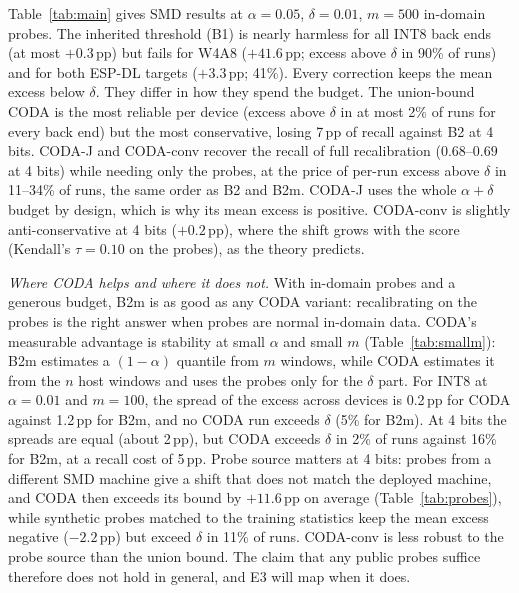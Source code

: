 \documentclass[conference]{IEEEtran}
\begin{document}


Table~\ref{tab:main} gives SMD results at $\alpha=0.05$, $\delta=0.01$, $m=500$ in-domain probes. The inherited threshold (B1) is nearly harmless for all INT8 back ends (at most $+0.3$\,pp) but fails for W4A8 ($+41.6$\,pp; excess above $\delta$ in 90\% of runs) and for both ESP-DL targets ($+3.3$\,pp; 41\%). Every correction keeps the mean excess below $\delta$. They differ in how they spend the budget. The union-bound CODA is the most reliable per device (excess above $\delta$ in at most 2\% of runs for every back end) but the most conservative, losing 7\,pp of recall against B2 at 4 bits. CODA-J and CODA-conv recover the recall of full recalibration ($0.68$--$0.69$ at 4 bits) while needing only the probes, at the price of per-run excess above $\delta$ in 11--34\% of runs, the same order as B2 and B2m. CODA-J uses the whole $\alpha+\delta$ budget by design, which is why its mean excess is positive. CODA-conv is slightly anti-conservative at 4 bits ($+0.2$\,pp), where the shift grows with the score (Kendall's $\tau=0.10$ on the probes), as the theory predicts.




\emph{Where CODA helps and where it does not.} With in-domain probes and a generous budget, B2m is as good as any CODA variant: recalibrating on the probes is the right answer when probes are normal in-domain data. CODA's measurable advantage is stability at small $\alpha$ and small $m$ (Table~\ref{tab:smallm}): B2m estimates a $(1-\alpha)$ quantile from $m$ windows, while CODA estimates it from the $n$ host windows and uses the probes only for the $\delta$ part. For INT8 at $\alpha=0.01$ and $m=100$, the spread of the excess across devices is 0.2\,pp for CODA against 1.2\,pp for B2m, and no CODA run exceeds $\delta$ (5\% for B2m). At 4 bits the spreads are equal (about 2\,pp), but CODA exceeds $\delta$ in 2\% of runs against 16\% for B2m, at a recall cost of 5\,pp. Probe source matters at 4 bits: probes from a different SMD machine give a shift that does not match the deployed machine, and CODA then exceeds its bound by $+11.6$\,pp on average (Table~\ref{tab:probes}), while synthetic probes matched to the training statistics keep the mean excess negative ($-2.2$\,pp) but exceed $\delta$ in 11\% of runs. CODA-conv is less robust to the probe source than the union bound. The claim that any public probes suffice therefore does not hold in general, and E3 will map when it does.
\end{document}
